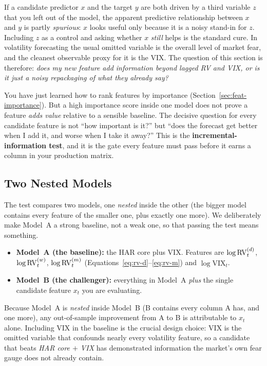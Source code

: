 \begin{prereq}
If a candidate predictor $x$ and the target $y$ are both driven by a third variable $z$ that you left out of the model, the apparent predictive relationship between $x$ and $y$ is partly \emph{spurious}: $x$ looks useful only because it is a noisy stand-in for $z$. Including $z$ as a control and asking whether $x$ \emph{still} helps is the standard cure. In volatility forecasting the usual omitted variable is the overall level of market fear, and the cleanest observable proxy for it is the VIX. The question of this section is therefore: \emph{does my new feature add information beyond lagged RV and VIX, or is it just a noisy repackaging of what they already say?}
\end{prereq}

You have just learned how to rank features by importance (Section~\ref{sec:feat-importance}). But a high importance score inside one model does not prove a feature \emph{adds value} relative to a sensible baseline. The decisive question for every candidate feature is not ``how important is it?'' but ``does the forecast get better when I add it, and worse when I take it away?'' This is the \textbf{incremental-information test}, and it is the gate every feature must pass before it earns a column in your production matrix.

\subsection{Two Nested Models}\label{sec:feat-incremental-nested}

The test compares two models, one \emph{nested} inside the other (the bigger model contains every feature of the smaller one, plus exactly one more). We deliberately make Model~A a strong baseline, not a weak one, so that passing the test means something.

\begin{itemize}[nosep]
  \item \textbf{Model~A (the baseline):} the HAR core plus VIX. Features are $\log \operatorname{RV}_t^{(d)}$, $\log \operatorname{RV}_t^{(w)}$, $\log \operatorname{RV}_t^{(m)}$ (Equations~\ref{eq:rv-d}--\ref{eq:rv-m}) and $\log \text{VIX}_t$.
  \item \textbf{Model~B (the challenger):} everything in Model~A \emph{plus} the single candidate feature $x_t$ you are evaluating.
\end{itemize}

Because Model~A is \emph{nested} inside Model~B (B contains every column A has, and one more), any out-of-sample improvement from A to B is attributable to $x_t$ alone. Including VIX in the baseline is the crucial design choice: VIX is the omitted variable that confounds nearly every volatility feature, so a candidate that beats \emph{HAR core $+$ VIX} has demonstrated information the market's own fear gauge does not already contain.

